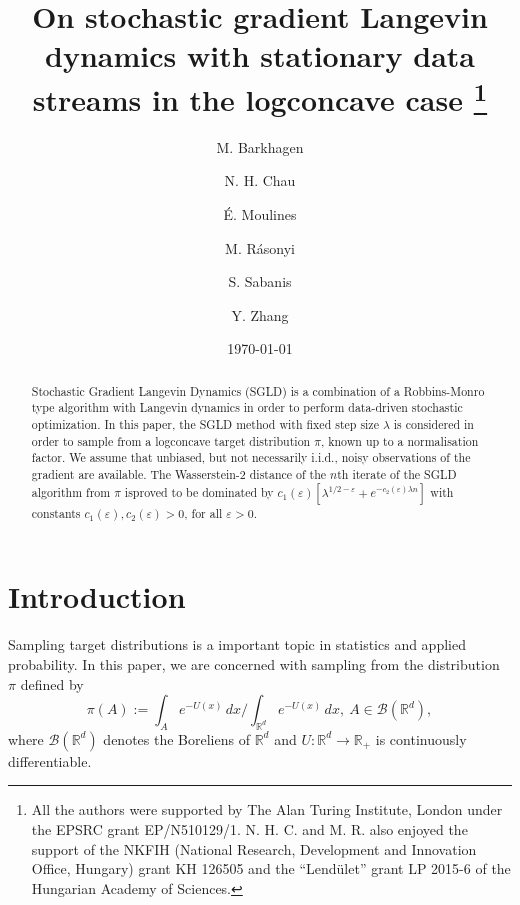 \documentclass[a4paper]{article}
\begin{document}
\title{On stochastic gradient Langevin dynamics with stationary data streams
in the logconcave case
	\thanks{All the authors were supported by The Alan Turing Institute, London under the EPSRC grant EP/N510129/1. N. H. C. and M. R. also enjoyed the support of the NKFIH (National Research, Development and Innovation Office, Hungary) grant KH 126505 and the ``Lend\"ulet'' grant LP 2015-6 of the Hungarian Academy of Sciences.} }
\author{M. Barkhagen \and N. H. Chau \and \'E. Moulines \and
M. R\'asonyi \and S. Sabanis \and Y. Zhang}

\date{\today}
\maketitle

\begin{abstract}
Stochastic Gradient Langevin Dynamics (SGLD) is a combination of a Robbins-Monro type algorithm with Langevin dynamics in order to perform data-driven stochastic optimization. In this paper, the SGLD method with fixed step size $\lambda$
is considered in order to sample from a logconcave target distribution $\pi$, known up to a normalisation factor. We assume that unbiased, but not necessarily i.i.d.,
noisy observations of the gradient are available. The
Wasserstein-2 distance of the $n$th iterate of the SGLD algorithm from
$\pi$ isproved to be dominated by
$c_1(\varepsilon)[\lambda^{1/2 - \varepsilon}+e^{-c_2(\varepsilon)\lambda n}]$ with constants $c_1(\varepsilon), c_2(\varepsilon)>0$, for all $\varepsilon>0$.
\end{abstract}

\section{Introduction}
Sampling target distributions is a important topic in statistics and applied probability. %
In this paper, we are concerned with sampling from the distribution $\pi$ defined by
$$
\pi(A):=\int_A e^{-U(x)}\, dx/\int_{\mathbb{R}^d} e^{-U(x)}\, dx,\
A\in\mathcal{B}(\mathbb{R}^d),
$$
where $\mathcal{B}(\mathbb{R}^d)$ denotes the Boreliens of $\mathbb{R}^d$
and $U:\mathbb{R}^d\to\mathbb{R}_+$ is continuously
differentiable.
\end{document}
